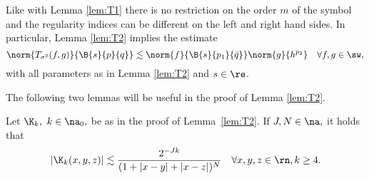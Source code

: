 Like with Lemma \ref{lem:T1} there is no restriction on the order $m$ of the symbol and the regularity indices can be different on the left and right hand sides. In particular, Lemma \ref{lem:T2} implies the estimate
$$
\norm{T_{\sigma^2}(f,g)}{\B{s}{p}{q}}  \lesssim \norm{f}{\B{s}{p_1}{\bar{q}}} \norm{g}{h^{p_2}} \quad \forall f, g \in \sw,$$
with all parameters as in Lemma \ref{lem:T2} and $s\in\re$. 


The following two lemmas will be useful in the proof of Lemma \ref{lem:T2}.

\begin{lemma}\label{lem:estimateKk} Let  $\K_k,$ $k\in\na_0,$ be as in the proof of Lemma~\ref{lem:T2}. If $J, N \in \na,$  it holds that 
\begin{equation}\label{eq:estimateKk}
|\K_k(x,y,z)| \lesssim \frac{2^{-Jk}}{(1+ |x-y| + |x-z|)^{N}} \quad \forall x, y, z \in \rn, k \ge 4. 
\end{equation}
\end{lemma}

